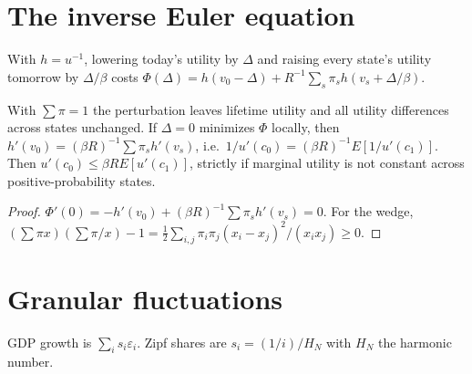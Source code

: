 \section{The inverse Euler equation}

\begin{definition}
\label{def:inverse_euler}
\leanok
With $h=u^{-1}$, lowering today's utility by $\Delta$ and raising every state's utility tomorrow by $\Delta/\beta$ costs
$\Phi(\Delta)=h(v_0-\Delta)+R^{-1}\sum_s\pi_sh(v_s+\Delta/\beta)$.
\end{definition}

\begin{theorem}
\label{thm:inverse_euler}
\leanok
{}
With $\sum\pi=1$ the perturbation leaves lifetime utility and all utility differences across states unchanged. If $\Delta=0$
minimizes $\Phi$ locally, then $h'(v_0)=(\beta R)^{-1}\sum\pi_sh'(v_s)$, i.e.\ $1/u'(c_0)=(\beta R)^{-1}E[1/u'(c_1)]$. Then
$u'(c_0)\le\beta RE[u'(c_1)]$, strictly if marginal utility is not constant across positive-probability states.
\end{theorem}
\begin{proof}
\leanok
$\Phi'(0)=-h'(v_0)+(\beta R)^{-1}\sum\pi_sh'(v_s)=0$. For the wedge,
$(\sum\pi x)(\sum\pi/x)-1=\tfrac12\sum_{i,j}\pi_i\pi_j(x_i-x_j)^2/(x_ix_j)\ge0$.
\end{proof}

\section{Granular fluctuations}

\begin{definition}
\label{def:granular}
\leanok
GDP growth is $\sum_is_i\varepsilon_i$. Zipf shares are $s_i=(1/i)/H_N$ with $H_N$ the harmonic number.
\end{definition}

